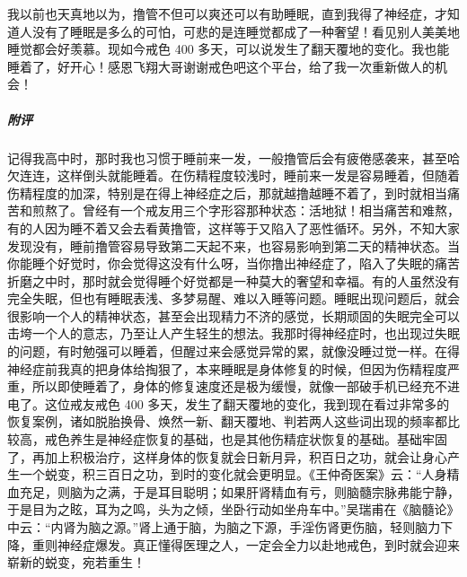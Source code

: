 \begin{case}
    我以前也天真地以为，撸管不但可以爽还可以有助睡眠，直到我得了神经症，才知道人没有了睡眠是多么的可怕，可悲的是连睡觉都成了一种奢望！看见别人美美地睡觉都会好羡慕。现如今戒色 400 多天，可以说发生了翻天覆地的变化。我也能睡着了，好开心！感恩飞翔大哥谢谢戒色吧这个平台，给了我一次重新做人的机会！
    \subparagraph{附评} 记得我高中时，那时我也习惯于睡前来一发，一般撸管后会有疲倦感袭来，甚至哈欠连连，这样倒头就能睡着。在伤精程度较浅时，睡前来一发是容易睡着，但随着伤精程度的加深，特别是在得上神经症之后，那就越撸越睡不着了，到时就相当痛苦和煎熬了。曾经有一个戒友用三个字形容那种状态：活地狱！相当痛苦和难熬，有的人因为睡不着又会去看黄撸管，这样等于又陷入了恶性循环。另外，不知大家发现没有，睡前撸管容易导致第二天起不来，也容易影响到第二天的精神状态。当你能睡个好觉时，你会觉得这没有什么呀，当你撸出神经症了，陷入了失眠的痛苦折磨之中时，那时就会觉得睡个好觉都是一种莫大的奢望和幸福。有的人虽然没有完全失眠，但也有睡眠表浅、多梦易醒、难以入睡等问题。睡眠出现问题后，就会很影响一个人的精神状态，甚至会出现精力不济的感觉，长期顽固的失眠完全可以击垮一个人的意志，乃至让人产生轻生的想法。我那时得神经症时，也出现过失眠的问题，有时勉强可以睡着，但醒过来会感觉异常的累，就像没睡过觉一样。在得神经症前我真的把身体给掏狠了，本来睡眠是身体修复的时候，但因为伤精程度严重，所以即使睡着了，身体的修复速度还是极为缓慢，就像一部破手机已经充不进电了。这位戒友戒色 400 多天，发生了翻天覆地的变化，我到现在看过非常多的恢复案例，诸如脱胎换骨、焕然一新、翻天覆地、判若两人这些词出现的频率都比较高，戒色养生是神经症恢复的基础，也是其他伤精症状恢复的基础。基础牢固了，再加上积极治疗，这样身体的恢复就会日新月异，积百日之功，就会让身心产生一个蜕变，积三百日之功，到时的变化就会更明显。《王仲奇医案》云：“人身精血充足，则脑为之满，于是耳目聪明；如果肝肾精血有亏，则脑髓宗脉弗能宁静，于是目为之眩，耳为之鸣，头为之倾，坐卧行动如坐舟车中。”吴瑞甫在《脑髓论》中云：“内肾为脑之源。”肾上通于脑，为脑之下源，手淫伤肾更伤脑，轻则脑力下降，重则神经症爆发。真正懂得医理之人，一定会全力以赴地戒色，到时就会迎来崭新的蜕变，宛若重生！
\end{case}

